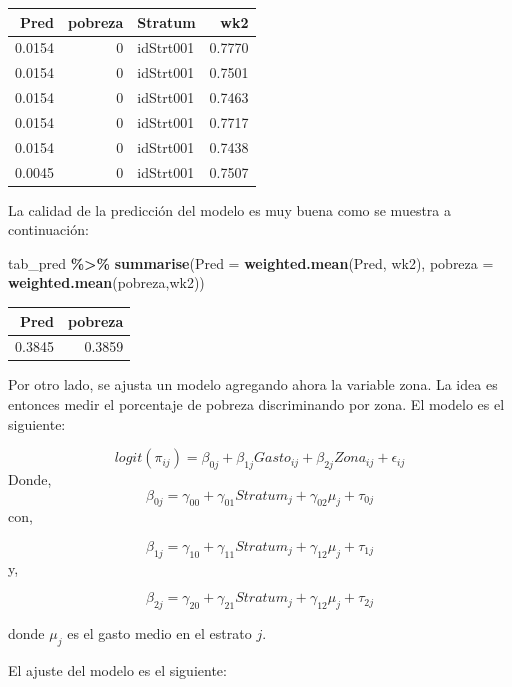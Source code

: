 \documentclass[
  12pt,
]{book}
\newenvironment{Shaded}{\begin{snugshade}}{\end{snugshade}}
\newcommand{\AttributeTok}[1]{\textcolor[rgb]{0.13,0.29,0.53}{#1}}
\newcommand{\FunctionTok}[1]{\textcolor[rgb]{0.13,0.29,0.53}{\textbf{#1}}}
\newcommand{\NormalTok}[1]{#1}
\newcommand{\SpecialCharTok}[1]{\textcolor[rgb]{0.81,0.36,0.00}{\textbf{#1}}}
\begin{document}
\begin{tabular}{r|r|l|r}
\hline
Pred & pobreza & Stratum & wk2\\
\hline
0.0154 & 0 & idStrt001 & 0.7770\\
\hline
0.0154 & 0 & idStrt001 & 0.7501\\
\hline
0.0154 & 0 & idStrt001 & 0.7463\\
\hline
0.0154 & 0 & idStrt001 & 0.7717\\
\hline
0.0154 & 0 & idStrt001 & 0.7438\\
\hline
0.0045 & 0 & idStrt001 & 0.7507\\
\hline
\end{tabular}

La calidad de la predicción del modelo es muy buena como se muestra a continuación:

\begin{Shaded}
\begin{Highlighting}[]
\NormalTok{tab\_pred }\SpecialCharTok{\%\textgreater{}\%} 
  \FunctionTok{summarise}\NormalTok{(}\AttributeTok{Pred =} \FunctionTok{weighted.mean}\NormalTok{(Pred, wk2), }
            \AttributeTok{pobreza =} \FunctionTok{weighted.mean}\NormalTok{(pobreza,wk2))}
\end{Highlighting}
\end{Shaded}

\begin{tabular}{r|r}
\hline
Pred & pobreza\\
\hline
0.3845 & 0.3859\\
\hline
\end{tabular}

Por otro lado, se ajusta un modelo agregando ahora la variable zona. La idea es entonces medir el porcentaje de pobreza discriminando por zona. El modelo es el siguiente:

\[
logit(\pi_{ij})=\beta_{0j}+\beta_{1j}Gasto_{ij}+\beta_{2j}Zona_{ij} +\epsilon_{ij}
\]
Donde,
\[
\beta_{0j} = \gamma_{00}+\gamma_{01}Stratum_{j} + \gamma_{02}\mu_{j}  + \tau_{0j}
\]
con,

\[
\beta_{1j} = \gamma_{10}+\gamma_{11}Stratum_{j} + \gamma_{12}\mu_{j} + \tau_{1j}
\]
y,

\[
\beta_{2j} = \gamma_{20}+\gamma_{21}Stratum_{j} + \gamma_{12}\mu_{j} + \tau_{2j}
\]

donde \(\mu_{j}\) es el gasto medio en el estrato \(j\).

El ajuste del modelo es el siguiente:
\end{document}
